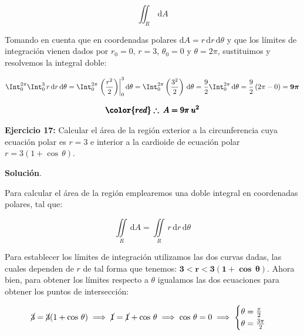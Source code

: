 \documentclass[12pt]{article}
\begin{document}
\begin{equation*}
	\iint_R\, \mathrm{d}A
\end{equation*}

\noindent Tomando en cuenta que en coordenadas polares $\mathrm{d}A = r\,\mathrm{d}r\,\mathrm{d}\theta$ y que los límites de integración vienen dados por $r_0 = 0$, $r = 3$, $\theta_0 = 0$ y $\theta = 2\pi$, sustituimos y resolvemos la integral doble:

\begin{align*}
	\Int_0^{2\pi} \Int_0^3\, r\,\mathrm{d}r\,\mathrm{d}\theta = \Int_0^{2\pi} \left.\left(\frac{r^2}{2}\right)\right|_0^3\mathrm{d}\theta = \Int_0^{2\pi} \left(\frac{3^2}{2}\right)\,\mathrm{d}\theta = \frac{9}{2}\Int_0^{2\pi} \,\mathrm{d}\theta = \frac{9}{2}\left(2\pi - 0\right) = \boldsymbol{9\pi}
\end{align*}

\begin{align*}
	\pmb{\color{red} \therefore\: A = 9\pi\: u^2}
\end{align*}

\noindent \textbf{Ejercicio 17:} Calcular el área de la región exterior a la circunferencia cuya ecuación polar es $r=3$ e interior a la cardioide de ecuación polar $r=3(1+\cos\,\theta)$.

\vspace{5mm}

\noindent \textbf{Solución}.

\vspace{3mm}

\noindent Para calcular el área de la región emplearemos una doble integral en coordenadas polares, tal que:

\begin{equation}\label{eqn:17-1}\tag{1}
	\iint\limits_R\, \mathrm{d}A = \iint\limits_R\, r\,\mathrm{d}r\,\mathrm{d}\theta
\end{equation}

\noindent Para establecer los límites de integración utilizamos las dos curvas dadas, las cuales dependen de $r$ de tal forma que tenemos: $\boldsymbol{3<r<3(1+\cos\,\theta)}$. Ahora bien, para obtener los límites respecto a $\theta$ igualamos las dos ecuaciones para obtener los puntos de intersección:

\begin{align*}
	\cancel{3} = \cancel{3}(1 + \cos\,\theta) \implies \cancel{1} = \cancel{1} + \cos\,\theta \implies \cos\,\theta = 0 \implies \begin{cases}
		\theta = \frac{\pi}{2} \\
		\theta = \frac{3\pi}{2}
	\end{cases}
\end{align*}
\end{document}
